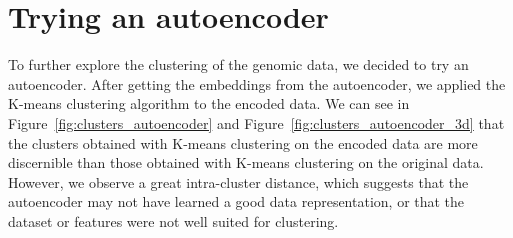 \section{Trying an autoencoder}
\label{sec:autoencoder}

To further explore the clustering of the genomic data, we decided to try an autoencoder. After getting the embeddings from the autoencoder,
we applied the K-means clustering algorithm to the encoded data. We can see in Figure~\ref{fig:clusters_autoencoder} and
Figure~\ref{fig:clusters_autoencoder_3d} that the clusters obtained with K-means clustering on the encoded data are more discernible
than those obtained with K-means clustering on the original data. However, we observe a great intra-cluster distance, which suggests that
the autoencoder may not have learned a good data representation, or that the dataset or features were not well suited for clustering.

